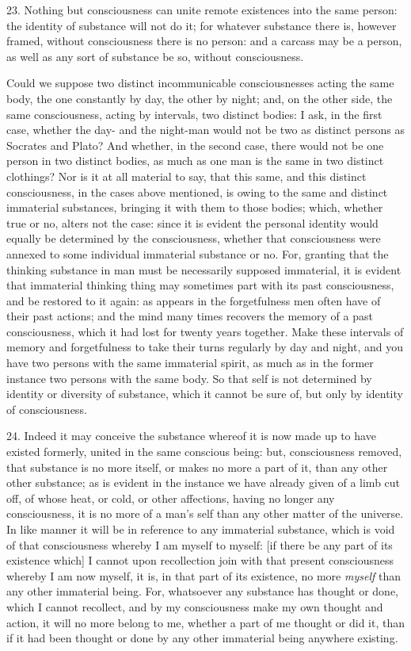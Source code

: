 23. Nothing but consciousness can unite remote existences into the
same person: the identity of substance will not do it; for whatever
substance there is, however framed, without consciousness there is no
person: and a carcass may be a person, as well as any sort of
substance be so, without consciousness.


Could we suppose two distinct incommunicable consciousnesses acting
the same body, the one constantly by day, the other by night; and, on
the other side, the same consciousness, acting by intervals, two
distinct bodies: I ask, in the first case, whether the day- and the
night-man would not be two as distinct persons as Socrates and Plato?
And whether, in the second case, there would not be one person in two
distinct bodies, as much as one man is the same in two distinct
clothings? Nor is it at all material to say, that this same, and
this distinct consciousness, in the cases above mentioned, is owing to
the same and distinct immaterial substances, bringing it with them to
those bodies; which, whether true or no, alters not the case: since
it is evident the personal identity would equally be determined by the
consciousness, whether that consciousness were annexed to some
individual immaterial substance or no. For, granting that the thinking
substance in man must be necessarily supposed immaterial, it is
evident that immaterial thinking thing may sometimes part with its
past consciousness, and be restored to it again: as appears in the
forgetfulness men often have of their past actions; and the mind
many times recovers the memory of a past consciousness, which it had
lost for twenty years together. Make these intervals of memory and
forgetfulness to take their turns regularly by day and night, and you
have two persons with the same immaterial spirit,  as much
as in the former instance two persons with the same body. So that self
is not determined by identity or diversity of substance, which it
cannot be sure of, but only by identity of consciousness.

24. Indeed it may conceive the substance whereof it is now made up to
have existed formerly, united in the same conscious being: but,
consciousness removed, that substance is no more itself, or makes no
more a part of it, than any other other substance; as is evident in
the instance we have already given of a limb cut off, of whose heat,
or cold, or other affections, having no longer any consciousness, it
is no more of a man's self than any other matter of the universe. In
like manner it will be in reference to any immaterial substance, which
is void of that consciousness whereby I am myself to myself: [if there
be any part of its existence which] I cannot upon recollection join
with that present consciousness whereby I am now myself, it is, in
that part of its existence, no more \textit{myself} than any other
immaterial being. For, whatsoever any substance has thought or done,
which I cannot recollect, and by my consciousness make my own thought
and action, it will no more belong to me, whether a part of me thought
or did it, than if it had been thought or done by any other immaterial
being anywhere existing.

